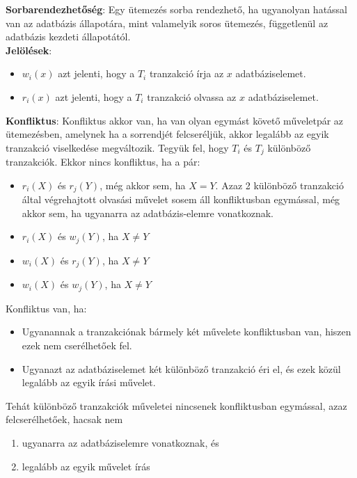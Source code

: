 \documentclass[margin=0px]{article}
\begin{document}
	\noindent \textbf{Sorbarendezhetőség}: Egy ütemezés sorba rendezhető, ha ugyanolyan hatással van az adatbázis állapotára,
	mint valamelyik soros ütemezés, függetlenül az adatbázis kezdeti állapotától.\\
	
	\noindent \textbf{Jelölések}:
	\begin{itemize}
		\item	$w_{i}(x)$ azt jelenti, hogy a $T_{i}$ tranzakció írja az $x$ adatbáziselemet.
		\item	$r_{i}(x)$ azt jelenti, hogy a $T_{i}$ tranzakció olvassa az $x$ adatbáziselemet.
	\end{itemize}
	
	\noindent \textbf{Konfliktus}: Konfliktus akkor van, ha van olyan egymást követő műveletpár az ütemezésben, amelynek ha a sorrendjét felcseréljük, akkor legalább az egyik tranzakció viselkedése megváltozik. Tegyük fel, hogy $T_{i}$ és $T_{j}$ különböző tranzakciók.
	Ekkor nincs konfliktus, ha a pár:
	\begin{itemize}
		\item	 $r_{i}(X)$ és $r_{j}(Y)$, még akkor sem, ha $X = Y$. Azaz 2 különböző tranzakció által végrehajtott olvasási művelet
		sosem áll konfliktusban egymással, még akkor sem, ha ugyanarra az adatbázis-elemre vonatkoznak.
		
		\item	$r_{i}(X)$ és   $w_{j}(Y)$, ha $X \not = Y$
		
		\item	$w_{i}(X)$ és   $r_{j}(Y)$, ha $X \not = Y$
		
		\item	$w_{i}(X)$ és   $w_{j}(Y)$, ha $X \not = Y$
	\end{itemize}
	
	\noindent Konfliktus van, ha:
	\begin{itemize}
		\item	Ugyanannak a tranzakciónak bármely két művelete konfliktusban van, hiszen ezek nem cserélhetőek fel.
		\item	Ugyanazt az adatbáziselemet két különböző tranzakció éri el, és ezek közül legalább az egyik írási művelet.
	\end{itemize}
	
	Tehát különböző tranzakciók műveletei nincsenek konfliktusban egymással, azaz felcserélhetőek, hacsak nem
	\begin{enumerate}
		\item	ugyanarra az adatbáziselemre vonatkoznak, és
		\item	legalább az egyik művelet írás
	\end{enumerate}
	
\end{document}
